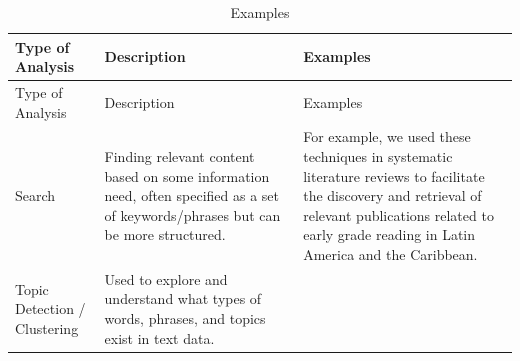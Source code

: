 \documentclass[]{krantz}
\begin{document}
\begin{longtable}[]{@{}lll@{}}
\caption{\label{tab:table7-0} Examples}\tabularnewline
\toprule
\begin{minipage}[b]{0.12\columnwidth}\raggedright\strut
Type of Analysis\strut
\end{minipage} & \begin{minipage}[b]{0.16\columnwidth}\raggedright\strut
Description\strut
\end{minipage} & \begin{minipage}[b]{0.63\columnwidth}\raggedright\strut
Examples\strut
\end{minipage}\tabularnewline
\midrule
\endfirsthead
\toprule
\begin{minipage}[b]{0.12\columnwidth}\raggedright\strut
Type of Analysis\strut
\end{minipage} & \begin{minipage}[b]{0.16\columnwidth}\raggedright\strut
Description\strut
\end{minipage} & \begin{minipage}[b]{0.63\columnwidth}\raggedright\strut
Examples\strut
\end{minipage}\tabularnewline
\midrule
\endhead
\begin{minipage}[t]{0.12\columnwidth}\raggedright\strut
Search\strut
\end{minipage} & \begin{minipage}[t]{0.16\columnwidth}\raggedright\strut
Finding relevant content based on some information need, often specified
as a set of keywords/phrases but can be more structured.\strut
\end{minipage} & \begin{minipage}[t]{0.63\columnwidth}\raggedright\strut
For example, we used these techniques in systematic literature reviews
to facilitate the discovery and retrieval of relevant publications
related to early grade reading in Latin America and the Caribbean.
\strut
\end{minipage}\tabularnewline
\begin{minipage}[t]{0.12\columnwidth}\raggedright\strut
Topic Detection / Clustering\strut
\end{minipage} & \begin{minipage}[t]{0.16\columnwidth}\raggedright\strut
Used to explore and understand what types of words, phrases, and topics
exist in text data.\strut
\end{minipage} & \begin{minipage}[t]{0.63\columnwidth}\raggedright\strut

\end{minipage}
\end{longtable}
\end{document}
